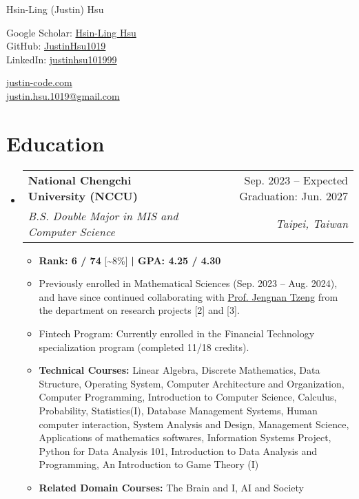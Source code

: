 \documentclass[letterpaper,10pt]{article}
\makeatletter
\newcommand{\resumeItem}[1]{
  \item\small{
    {#1 \vspace{-2pt}}
  }
}
\newcommand{\resumeSubheading}[4]{
  \vspace{-2pt}\item
    \begin{tabular*}{0.97\textwidth}[t]{l@{\extracolsep{\fill}}r}
      \textbf{#1} & #2 \\
      \textit{\small#3} & \textit{\small #4} \\
    \end{tabular*}\vspace{-7pt}
}
\newcommand{\resumeSubHeadingListStart}{\begin{itemize}[leftmargin=0.15in, label={}]}
\newcommand{\resumeSubHeadingListEnd}{\end{itemize}}
\newcommand{\resumeItemListStart}{\begin{itemize}}
\newcommand{\resumeItemListEnd}{\end{itemize}\vspace{-5pt}}
\makeatother
\begin{document}
\begin{center}
    {\LARGE Hsin-Ling (Justin) Hsu} \\ \vspace{2pt}
    \begin{multicols}{2}
    \begin{flushleft}
    Google Scholar: \href{{https://scholar.google.com/citations?user=pCXJM5AAAAAJ}}{Hsin-Ling Hsu} \\ \vspace{1pt}
    GitHub: \href{{https://github.com/justinHsu1019}}{JustinHsu1019}\\ \vspace{1pt}
    LinkedIn: \href{{https://www.linkedin.com/in/justinhsu101999}}{justinhsu101999}
    \end{flushleft}
    \begin{flushright}
    \href{{https://justin-code.com}}{justin-code.com}\\ \vspace{5pt}
    \href{mailto:justin.hsu.1019@gmail.com}{justin.hsu.1019@gmail.com}
    \end{flushright}
    \end{multicols}
\end{center}

\vspace{-15pt}
\section{Education}
  \resumeSubHeadingListStart
      \resumeSubheading
      {National Chengchi University (NCCU)}{Sep. 2023 – Expected Graduation: Jun. 2027}
      {B.S. Double Major in MIS and Computer Science}{Taipei, Taiwan}
      \resumeItemListStart
      \vspace{0.3em}
        \resumeItem{\textbf{Rank: 6 / 74} [\textasciitilde8\%] \textbf{| GPA: 4.25 / 4.30}}
        \resumeItem{Previously enrolled in Mathematical Sciences (Sep. 2023 -- Aug. 2024), and have since continued collaborating with \href{https://ms.nccu.edu.tw/PageStaffing/Detail?fid=4666\&id=1118}{Prof. Jengnan Tzeng} from the department on research projects [2] and [3].}
        \resumeItem{Fintech Program: Currently enrolled in the Financial Technology specialization program (completed 11/18 credits).}
        \resumeItem{\textbf{Technical Courses:} Linear Algebra, Discrete Mathematics, Data Structure, Operating System, Computer Architecture and Organization, Computer Programming, Introduction to Computer Science, Calculus, Probability, Statistics(I), Database Management Systems, Human computer interaction, System Analysis and Design, Management Science, Applications of mathematics softwares, Information Systems Project, Python for Data Analysis 101, Introduction to Data Analysis and Programming, An Introduction to Game Theory (I)}
        \resumeItem{\textbf{Related Domain Courses:} The Brain and I, AI and Society}
      \resumeItemListEnd
  \resumeSubHeadingListEnd
\end{document}
